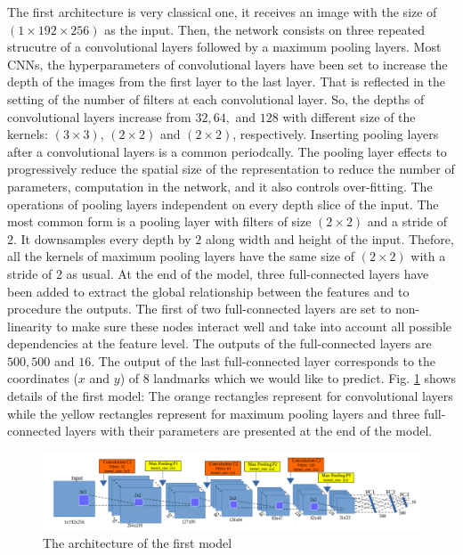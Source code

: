 \documentclass[review]{elsarticle}
\begin{document}
The first architecture is very classical one, it receives an image with the size of $(1 \times 192 \times 256)$ as the input. Then, the network consists on three repeated strucutre of a convolutional layers followed by a maximum pooling layers. Most CNNs, the hyperparameters of convolutional layers have been set to increase the depth of the images from the first layer to the last layer. That is reflected in the setting of the number of filters at each convolutional layer. So, the depths of convolutional layers increase from $32, 64, $ and $128$ with different size of the kernels: $(3 \times 3)$, $(2 \times 2)$ and $(2 \times 2)$, respectively. Inserting pooling layers after a convolutional layers is a common periodcally. The pooling layer effects to progressively reduce the spatial size of the representation to reduce the number of parameters, computation in the network, and it also controls over-fitting. The operations of pooling layers independent on every depth slice of the input. The most common form is a pooling layer with filters of size $(2 \times 2)$ and a stride of $2$. It downsamples every depth by $2$ along width and height of the input. Thefore, all the kernels of maximum pooling layers have the same size of $(2 \times 2)$ with a stride of $2$ as usual. At the end of the model, three full-connected layers have been added to extract the global relationship between the features and to procedure the outputs. The first of two full-connected layers are set to non-linearity to make sure these nodes interact well and take into account all possible dependencies at the feature level. The outputs of the full-connected layers are $500, 500$ and $16$. The output of the last full-connected layer corresponds to the coordinates ($x$ and $y$) of $8$ landmarks which we would like to predict. Fig. \ref{fignet1} shows details of the first model: The orange rectangles represent for convolutional layers while the yellow rectangles represent for maximum pooling layers and three full-connected layers with their parameters are presented at the end of the model.

\begin{figure}[!h]
	\centering
	\includegraphics[scale=0.3]{images/net1}
	\caption{The architecture of the first model}
	\label{fignet1}
\end{figure}
\end{document}
